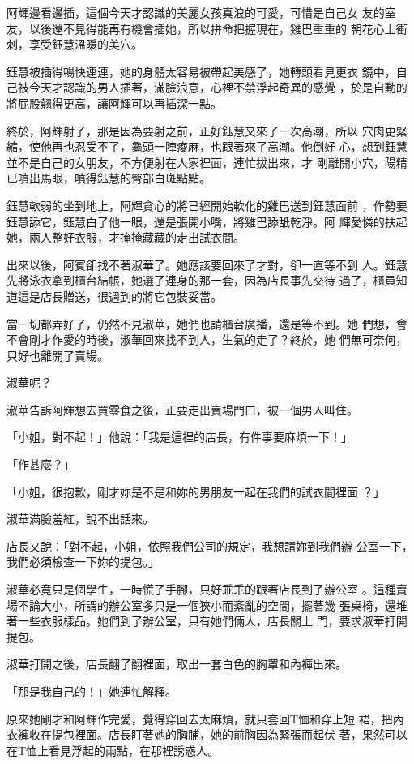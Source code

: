 阿輝邊看邊插，這個今天才認識的美麗女孩真浪的可愛，可惜是自己女
友的室友，以後還不見得能再有機會插她，所以拼命把握現在，雞巴重重的
朝花心上衝刺，享受鈺慧溫暖的美穴。

鈺慧被插得暢快連連，她的身體太容易被帶起美感了，她轉頭看見更衣
鏡中，自己被今天才認識的男人插著，滿臉浪意，心裡不禁浮起奇異的感覺
，於是自動的將屁股翹得更高，讓阿輝可以再插深一點。

終於，阿輝射了，那是因為要射之前，正好鈺慧又來了一次高潮，所以
穴肉更緊縮，使他再也忍受不了，龜頭一陣痠麻，也跟著來了高潮。他倒好
心，想到鈺慧並不是自己的女朋友，不方便射在人家裡面，連忙拔出來，才
剛離開小穴，陽精已噴出馬眼，噴得鈺慧的臀部白斑點點。

鈺慧軟弱的坐到地上，阿輝貪心的將已經開始軟化的雞巴送到鈺慧面前
，作勢要鈺慧舔它，鈺慧白了他一眼，還是張開小嘴，將雞巴舔舐乾淨。阿
輝愛憐的扶起她，兩人整好衣服，才掩掩藏藏的走出試衣間。

出來以後，阿賓卻找不著淑華了。她應該要回來了才對，卻一直等不到
人。鈺慧先將泳衣拿到櫃台結帳，她選了連身的那一套，因為店長事先交待
過了，櫃員知道這是店長贈送，很週到的將它包裝妥當。

當一切都弄好了，仍然不見淑華，她們也請櫃台廣播，還是等不到。她
們想，會不會剛才作愛的時後，淑華回來找不到人，生氣的走了？終於，她
們無可奈何，只好也離開了賣場。

淑華呢？

淑華告訴阿輝想去買零食之後，正要走出賣場門口，被一個男人叫住。

「小姐，對不起！」他說：「我是這裡的店長，有件事要麻煩一下！」

「作甚麼？」

「小姐，很抱歉，剛才妳是不是和妳的男朋友一起在我們的試衣間裡面
？」

淑華滿臉羞紅，說不出話來。

店長又說：「對不起，小姐，依照我們公司的規定，我想請妳到我們辦
公室一下，我們必須檢查一下妳的提包。」

淑華必竟只是個學生，一時慌了手腳，只好乖乖的跟著店長到了辦公室
。這種賣場不論大小，所謂的辦公室多只是一個狹小而紊亂的空間，擺著幾
張桌椅，還堆著一些衣服樣品。她們到了辦公室，只有她們倆人，店長關上
門，要求淑華打開提包。

淑華打開之後，店長翻了翻裡面，取出一套白色的胸罩和內褲出來。

「那是我自己的！」她連忙解釋。

原來她剛才和阿輝作完愛，覺得穿回去太麻煩，就只套回T恤和穿上短
裙，把內衣褲收在提包裡面。店長盯著她的胸脯，她的前胸因為緊張而起伏
著，果然可以在T恤上看見浮起的兩點，在那裡誘惑人。

